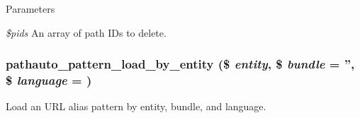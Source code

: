 \begin{DoxyParams}{Parameters}
\item[{\em \$pids}]An array of path IDs to delete. \end{DoxyParams}
\hypertarget{pathauto_8module_ae0f9acc2cba367467b5ef26d4d69e7b4}{
\subsubsection[{pathauto\_\-pattern\_\-load\_\-by\_\-entity}]{\setlength{\rightskip}{0pt plus 5cm}pathauto\_\-pattern\_\-load\_\-by\_\-entity (\$ {\em entity}, \/  \$ {\em bundle} = {\ttfamily ''}, \/  \$ {\em language} = {})}}
\label{pathauto_8module_ae0f9acc2cba367467b5ef26d4d69e7b4}
Load an URL alias pattern by entity, bundle, and language.


